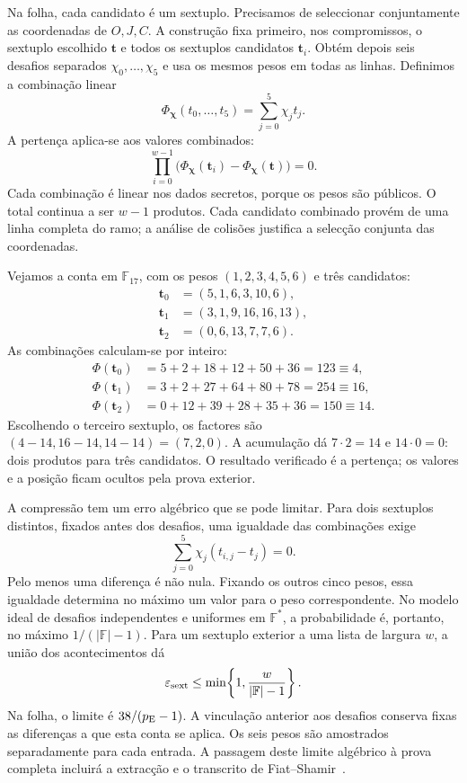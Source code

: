 Na folha, cada candidato é um sextuplo. Precisamos de
seleccionar conjuntamente as coordenadas de \(O,J,C\).
A construção fixa primeiro, nos compromissos, o sextuplo
escolhido \(\boldsymbol t\) e todos os sextuplos candidatos
\(\boldsymbol t_i\). Obtém depois seis desafios separados
\(\chi_0,\ldots,\chi_5\) e usa os mesmos pesos em todas
as linhas. Definimos a combinação linear
\[
 \Phi_{\boldsymbol\chi}(t_0,\ldots,t_5)
       =\sum_{j=0}^{5}\chi_jt_j.
\]
A pertença aplica-se aos valores combinados:
\begin{equation}
 \prod_{i=0}^{w-1}
   \bigl(\Phi_{\boldsymbol\chi}(\boldsymbol t_i)
        -\Phi_{\boldsymbol\chi}(\boldsymbol t)\bigr)=0.
 \label{eq:fcmp-tuple-membership}
\end{equation}
Cada combinação é linear nos dados secretos, porque os
pesos são públicos. O total continua a ser \(w-1\)
produtos. Cada candidato combinado provém de uma linha
completa do ramo; a análise de colisões justifica a
selecção conjunta das coordenadas.

Vejamos a conta em \(\mathbb F_{17}\), com os pesos
\((1,2,3,4,5,6)\) e três candidatos:
\[
 \begin{aligned}
 \boldsymbol t_0&=(5,1,6,3,10,6),\\
 \boldsymbol t_1&=(3,1,9,16,16,13),\\
 \boldsymbol t_2&=(0,6,13,7,7,6).
 \end{aligned}
\]
As combinações calculam-se por inteiro:
\[
 \begin{aligned}
 \Phi(\boldsymbol t_0)&=5+2+18+12+50+36=123\equiv4,\\
 \Phi(\boldsymbol t_1)&=3+2+27+64+80+78=254\equiv16,\\
 \Phi(\boldsymbol t_2)&=0+12+39+28+35+36=150\equiv14.
 \end{aligned}
\]
Escolhendo o terceiro sextuplo, os factores são
\((4-14,16-14,14-14)=(7,2,0)\). A acumulação dá
\(7\cdot2=14\) e \(14\cdot0=0\): dois produtos para
três candidatos. O resultado verificado é a pertença;
os valores e a posição ficam ocultos pela prova exterior.

A compressão tem um erro algébrico que se pode limitar.
Para dois sextuplos distintos, fixados antes dos desafios,
uma igualdade das combinações exige
\[
 \sum_{j=0}^{5}\chi_j(t_{i,j}-t_j)=0.
\]
Pelo menos uma diferença é não nula. Fixando os outros
cinco pesos, essa igualdade determina no máximo um valor
para o peso correspondente. No modelo ideal de desafios
independentes e uniformes em \(\mathbb F^*\), a probabilidade
é, portanto, no máximo \(1/(|\mathbb F|-1)\).
Para um sextuplo exterior a uma lista de largura \(w\),
a união dos acontecimentos dá
\begin{equation}
 \varepsilon_{\rm sext}
     \leq\min\!\left\{1,\frac{w}{|\mathbb F|-1}\right\}.
 \label{eq:fcmp-tuple-error}
\end{equation}
Na folha, o limite é \(38/(p_{\rm E}-1)\).
A vinculação anterior aos desafios conserva fixas as
diferenças a que esta conta se aplica. Os seis pesos são
amostrados separadamente para cada entrada. A passagem
deste limite algébrico à prova completa incluirá a extracção
e o transcrito de Fiat--Shamir~\cite{monero-oxide-fcmp-source}.

